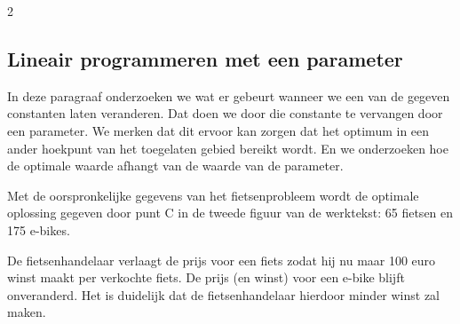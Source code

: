 \begin{multicols}{2}
\subsection{Lineair programmeren met een parameter}

    In deze paragraaf onderzoeken we wat er gebeurt wanneer we een van de gegeven constanten laten veranderen. Dat doen we door die constante te vervangen door een parameter. We merken dat dit ervoor kan zorgen dat het optimum in een ander hoekpunt van het toegelaten gebied bereikt wordt. En we onderzoeken hoe de optimale waarde afhangt van de waarde van de parameter. 

\end{multicols}


    Met de oorspronkelijke gegevens van het fietsenprobleem wordt de optimale oplossing gegeven door punt C in de tweede figuur van de werktekst: 65 fietsen en 175 e-bikes.

    De fietsenhandelaar verlaagt de prijs voor een fiets zodat hij nu maar 100 euro winst maakt per verkochte fiets. De prijs (en winst) voor een e-bike blijft onveranderd. Het is duidelijk dat de fietsenhandelaar hierdoor minder winst zal maken.


